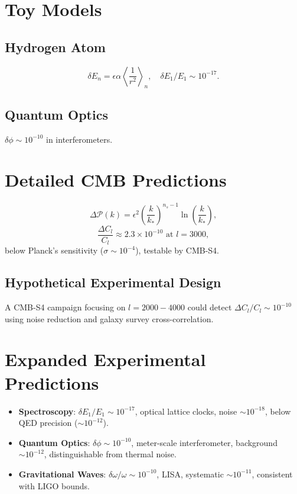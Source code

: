 \documentclass{article}
\begin{document}
\section{Toy Models}
\subsection{Hydrogen Atom}
\begin{equation}
\delta E_n = \epsilon \alpha \left\langle \frac{1}{r^2} \right\rangle_n, \quad \delta E_1 / E_1 \sim 10^{-17}.
\end{equation}

\subsection{Quantum Optics}
\(\delta \phi \sim 10^{-10}\) in interferometers.

\section{Detailed CMB Predictions}
\begin{equation}
\Delta \mathcal{P}(k) = \epsilon^2 \left( \frac{k}{k_*} \right)^{n_s-1} \ln \left( \frac{k}{k_*} \right),
\end{equation}
\begin{equation}
\frac{\Delta C_l}{C_l} \approx 2.3 \times 10^{-10} \text{ at } l = 3000,
\end{equation}
below Planck's sensitivity (\(\sigma \sim 10^{-4}\)), testable by CMB-S4.

\subsection{Hypothetical Experimental Design}
A CMB-S4 campaign focusing on \(l = 2000-4000\) could detect \(\Delta C_l / C_l \sim 10^{-10}\) using noise reduction and galaxy survey cross-correlation.

\section{Expanded Experimental Predictions}
\begin{itemize}
    \item \textbf{Spectroscopy}: \(\delta E_1 / E_1 \sim 10^{-17}\), optical lattice clocks, noise \(\sim 10^{-18}\), below QED precision (\(\sim 10^{-12}\)).
    \item \textbf{Quantum Optics}: \(\delta \phi \sim 10^{-10}\), meter-scale interferometer, background \(\sim 10^{-12}\), distinguishable from thermal noise.
    \item \textbf{Gravitational Waves}: \(\delta \omega / \omega \sim 10^{-10}\), LISA, systematic \(\sim 10^{-11}\), consistent with LIGO bounds.
\end{itemize}
\end{document}
